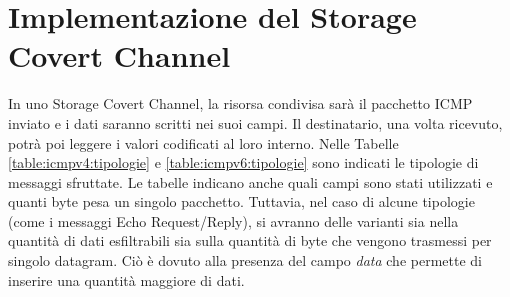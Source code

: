 \section{Implementazione del Storage Covert Channel}  
In uno Storage Covert Channel, la risorsa condivisa sarà il pacchetto ICMP 
inviato e i dati saranno scritti nei suoi campi. Il destinatario, una volta 
ricevuto, potrà poi leggere i valori codificati al loro interno. 
Nelle Tabelle \ref{table:icmpv4:tipologie} e \ref{table:icmpv6:tipologie} 
sono indicati le tipologie di messaggi sfruttate. Le tabelle indicano anche 
quali campi sono stati utilizzati e quanti byte pesa un singolo pacchetto. 
\vspace{2ex} \newline 
Tuttavia, nel caso di alcune tipologie (come i messaggi Echo Request/Reply), 
si avranno delle varianti sia nella quantità di dati esfiltrabili sia sulla 
quantità di byte che vengono trasmessi per singolo datagram.  
Ciò è dovuto alla presenza del campo \textit{data} che permette di inserire 
una quantità maggiore di dati. 
